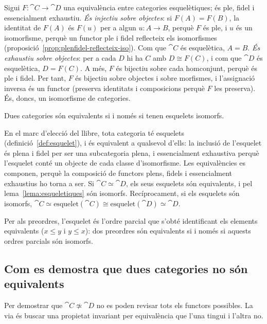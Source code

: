 \begin{prova}
Sigui $F\colon\cat{C}\to\cat{D}$ una equivalència entre categories esquelètiques; és ple, fidel i essencialment exhaustiu. \emph{És injectiu sobre objectes}: si $F(A)=F(B)$, la identitat de $F(A)$ és $F(u)$ per a algun $u\colon A\to B$, perquè $F$ és ple, i $u$ és un isomorfisme, perquè un functor ple i fidel reflecteix els isomorfismes (proposició~\ref{prop:plenfidel-reflecteix-iso}). Com que $\cat{C}$ és esquelètica, $A=B$. \emph{És exhaustiu sobre objectes}: per a cada $D$ hi ha $C$ amb $D\cong F(C)$, i com que $\cat{D}$ és esquelètica, $D=F(C)$. A més, $F$ és bijectiu sobre cada homconjunt, perquè és ple i fidel. Per tant, $F$ és bijectiu sobre objectes i sobre morfismes, i l'assignació inversa és un functor (preserva identitats i composicions perquè $F$ les preserva). És, doncs, un isomorfisme de categories.
\end{prova}

\begin{corollari}\label{cor:equivalencia-esquelets}
Dues categories són equivalents si i només si tenen esquelets isomorfs.
\end{corollari}

\begin{prova}
En el marc d'elecció del llibre, tota categoria té esquelets (definició~\ref{def:esquelet}), i és equivalent a qualsevol d'ells: la inclusió de l'esquelet és plena i fidel per ser una subcategoria plena, i essencialment exhaustiva perquè l'esquelet conté un objecte de cada classe d'isomorfisme. Les equivalències es componen, perquè la composició de functors plens, fidels i essencialment exhaustius ho torna a ser. Si $\cat{C}\simeq\cat{D}$, els seus esquelets són equivalents, i pel lema~\ref{lema:esqueletiques} són isomorfs. Recíprocament, si els esquelets són isomorfs, $\cat{C}\simeq\mathrm{esquelet}(\cat{C})\cong\mathrm{esquelet}(\cat{D})\simeq\cat{D}$.
\end{prova}

Per als preordres, l'esquelet és l'ordre parcial que s'obté identificant els elements equivalents ($x\le y$ i $y\le x$): dos preordres són equivalents si i només si aquests ordres parcials són isomorfs.

\subsection{Com es demostra que dues categories no són equivalents}

Per demostrar que $\cat{C}\not\simeq\cat{D}$ no es poden revisar tots els functors possibles. La via és buscar una propietat invariant per equivalència que l'una tingui i l'altra no.

